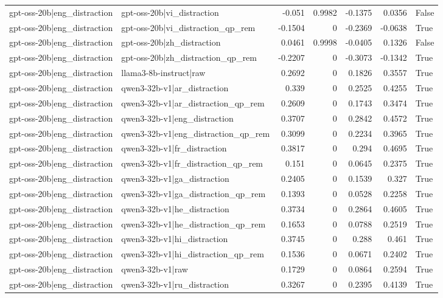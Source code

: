 \begin{table}
\begin{tabular}{l l r r r r l}
gpt-oss-20b|eng_distraction & gpt-oss-20b|vi_distraction & -0.051 & 0.9982 & -0.1375 & 0.0356 & False \\
gpt-oss-20b|eng_distraction & gpt-oss-20b|vi_distraction_qp_rem & -0.1504 & 0 & -0.2369 & -0.0638 & True \\
gpt-oss-20b|eng_distraction & gpt-oss-20b|zh_distraction & 0.0461 & 0.9998 & -0.0405 & 0.1326 & False \\
gpt-oss-20b|eng_distraction & gpt-oss-20b|zh_distraction_qp_rem & -0.2207 & 0 & -0.3073 & -0.1342 & True \\
gpt-oss-20b|eng_distraction & llama3-8b-instruct|raw & 0.2692 & 0 & 0.1826 & 0.3557 & True \\
gpt-oss-20b|eng_distraction & qwen3-32b-v1|ar_distraction & 0.339 & 0 & 0.2525 & 0.4255 & True \\
gpt-oss-20b|eng_distraction & qwen3-32b-v1|ar_distraction_qp_rem & 0.2609 & 0 & 0.1743 & 0.3474 & True \\
gpt-oss-20b|eng_distraction & qwen3-32b-v1|eng_distraction & 0.3707 & 0 & 0.2842 & 0.4572 & True \\
gpt-oss-20b|eng_distraction & qwen3-32b-v1|eng_distraction_qp_rem & 0.3099 & 0 & 0.2234 & 0.3965 & True \\
gpt-oss-20b|eng_distraction & qwen3-32b-v1|fr_distraction & 0.3817 & 0 & 0.294 & 0.4695 & True \\
gpt-oss-20b|eng_distraction & qwen3-32b-v1|fr_distraction_qp_rem & 0.151 & 0 & 0.0645 & 0.2375 & True \\
gpt-oss-20b|eng_distraction & qwen3-32b-v1|ga_distraction & 0.2405 & 0 & 0.1539 & 0.327 & True \\
gpt-oss-20b|eng_distraction & qwen3-32b-v1|ga_distraction_qp_rem & 0.1393 & 0 & 0.0528 & 0.2258 & True \\
gpt-oss-20b|eng_distraction & qwen3-32b-v1|he_distraction & 0.3734 & 0 & 0.2864 & 0.4605 & True \\
gpt-oss-20b|eng_distraction & qwen3-32b-v1|he_distraction_qp_rem & 0.1653 & 0 & 0.0788 & 0.2519 & True \\
gpt-oss-20b|eng_distraction & qwen3-32b-v1|hi_distraction & 0.3745 & 0 & 0.288 & 0.461 & True \\
gpt-oss-20b|eng_distraction & qwen3-32b-v1|hi_distraction_qp_rem & 0.1536 & 0 & 0.0671 & 0.2402 & True \\
gpt-oss-20b|eng_distraction & qwen3-32b-v1|raw & 0.1729 & 0 & 0.0864 & 0.2594 & True \\
gpt-oss-20b|eng_distraction & qwen3-32b-v1|ru_distraction & 0.3267 & 0 & 0.2395 & 0.4139 & True \\

\end{tabular}
\end{table}
